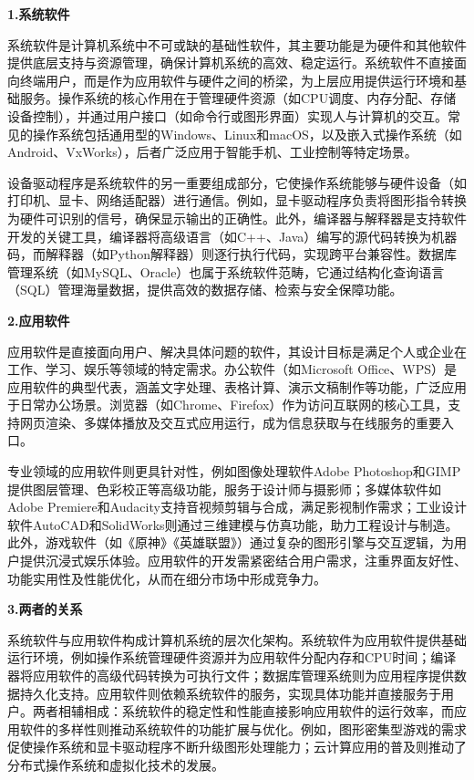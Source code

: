 \documentclass[12pt,a4paper]{ctexbook}
\begin{document}
\textbf{1.系统软件}

系统软件是计算机系统中不可或缺的基础性软件，其主要功能是为硬件和其他软件提供底层支持与资源管理，确保计算机系统的高效、稳定运行。系统软件不直接面向终端用户，而是作为应用软件与硬件之间的桥梁，为上层应用提供运行环境和基础服务。操作系统的核心作用在于管理硬件资源（如CPU调度、内存分配、存储设备控制），并通过用户接口（如命令行或图形界面）实现人与计算机的交互。常见的操作系统包括通用型的Windows、Linux和macOS，以及嵌入式操作系统（如Android、VxWorks），后者广泛应用于智能手机、工业控制等特定场景。

设备驱动程序是系统软件的另一重要组成部分，它使操作系统能够与硬件设备（如打印机、显卡、网络适配器）进行通信。例如，显卡驱动程序负责将图形指令转换为硬件可识别的信号，确保显示输出的正确性。此外，编译器与解释器是支持软件开发的关键工具，编译器将高级语言（如C++、Java）编写的源代码转换为机器码，而解释器（如Python解释器）则逐行执行代码，实现跨平台兼容性。数据库管理系统（如MySQL、Oracle）也属于系统软件范畴，它通过结构化查询语言（SQL）管理海量数据，提供高效的数据存储、检索与安全保障功能。

\textbf{2.应用软件}

应用软件是直接面向用户、解决具体问题的软件，其设计目标是满足个人或企业在工作、学习、娱乐等领域的特定需求。办公软件（如Microsoft
Office、WPS）是应用软件的典型代表，涵盖文字处理、表格计算、演示文稿制作等功能，广泛应用于日常办公场景。浏览器（如Chrome、Firefox）作为访问互联网的核心工具，支持网页渲染、多媒体播放及交互式应用运行，成为信息获取与在线服务的重要入口。

专业领域的应用软件则更具针对性，例如图像处理软件Adobe
Photoshop和GIMP提供图层管理、色彩校正等高级功能，服务于设计师与摄影师；多媒体软件如Adobe
Premiere和Audacity支持音视频剪辑与合成，满足影视制作需求；工业设计软件AutoCAD和SolidWorks则通过三维建模与仿真功能，助力工程设计与制造。此外，游戏软件（如《原神》《英雄联盟》）通过复杂的图形引擎与交互逻辑，为用户提供沉浸式娱乐体验。应用软件的开发需紧密结合用户需求，注重界面友好性、功能实用性及性能优化，从而在细分市场中形成竞争力。

\textbf{3.两者的关系}

系统软件与应用软件构成计算机系统的层次化架构。系统软件为应用软件提供基础运行环境，例如操作系统管理硬件资源并为应用软件分配内存和CPU时间；编译器将应用软件的高级代码转换为可执行文件；数据库管理系统则为应用程序提供数据持久化支持。应用软件则依赖系统软件的服务，实现具体功能并直接服务于用户。两者相辅相成：系统软件的稳定性和性能直接影响应用软件的运行效率，而应用软件的多样性则推动系统软件的功能扩展与优化。例如，图形密集型游戏的需求促使操作系统和显卡驱动程序不断升级图形处理能力；云计算应用的普及则推动了分布式操作系统和虚拟化技术的发展。
\end{document}
